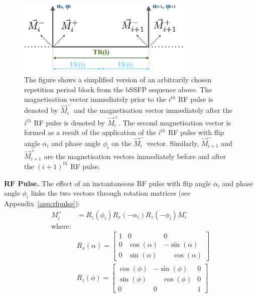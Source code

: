 \begin{figure}[ht]
    \centering
    \includegraphics[angle=0,width=0.75\textwidth, keepaspectratio]{images/mrf/sequencebSSFPOneBlock}
    \caption{The figure shows a simplified version of an arbitrarily chosen repetition period block from the bSSFP sequence above.
    The magnetisation vector immediately prior to the $i^{th}$ RF pulse is denoted by $\vec{M}^-_i$ and the magnetisation vector immediately after the $i^{th}$ RF pulse is denoted by $\vec{M}^+_i$.
    The second magnetisation vector is formed as a result of the application of the $i^{th}$ RF pulse with flip angle $\alpha_i$ and phase angle $\phi_i$ on the $\vec{M}^-_i$ vector.
    Similarly, $\vec{M}^-_{i+1}$ and $\vec{M}^+_{i+1}$ are the magnetisation vectors immediately before and after the $(i+1)^{th}$ RF pulse.
    }
    \label{fig:sequencebSSFPOneBlock}
\end{figure}

\textbf{RF Pulse.} 
The effect of an instantaneous RF pulse with flip angle $\alpha_i$ and phase angle $\phi_i$ links the two vectors through rotation matrices (see Appendix~\ref{app:rfpulse}):
\begin{equation}\label{eq:rfpulseequationbssfp}
    \begin{split}
        M^{+}_i & = R_{z}(\phi_i) R_{x}(-\alpha_i) R_{z}(-\phi_i) M^{-}_i \\
        \text{where:}         & \\
        & R_x(\alpha) = 
            \begin{bmatrix}
                1 &       0     &       0      \\
                0 & \cos(\alpha) & -\sin(\alpha) \\
                0 & \sin(\alpha) & \phantom{-}\cos(\alpha)
            \end{bmatrix} \\
        & R_z(\phi) = 
            \begin{bmatrix}
    	        \cos(\phi) & -\sin(\phi) & 0 \\
                \sin(\phi) & \phantom{-}\cos(\phi) & 0 \\
                    0   &      0     & 1
            \end{bmatrix}
    \end{split}
\end{equation}

